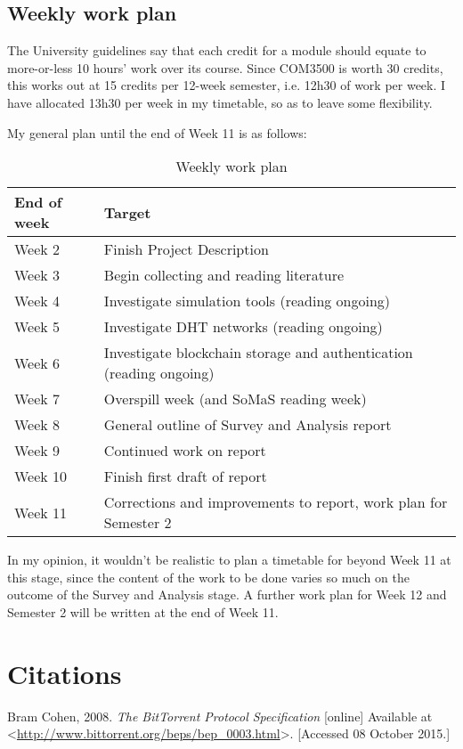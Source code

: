 \documentclass{article}
\begin{document}
\subsection{Weekly work plan}
The University guidelines say that each credit for a module should equate to more-or-less 10 hours' work over its course.  Since COM3500 is worth 30 credits, this works out at 15 credits per 12-week semester, i.e. 12h30 of work per week.  I have allocated 13h30 per week in my timetable, so as to leave some flexibility.

My general plan until the end of Week 11 is as follows:

\begin{table}[H]
  \centering
  \begin{tabular}{l l}
\textbf{End of week} & Target \\ \hline
Week 2               & Finish Project Description \\
Week 3               & Begin collecting and reading literature \\
Week 4               & Investigate simulation tools (reading ongoing) \\
Week 5               & Investigate DHT networks (reading ongoing) \\
Week 6               & Investigate blockchain storage and authentication (reading ongoing) \\
Week 7               & Overspill week (and SoMaS reading week) \\
Week 8               & General outline of Survey and Analysis report \\
Week 9               & Continued work on report \\
Week 10              & Finish first draft of report \\
Week 11              & Corrections and improvements to report, work plan for Semester 2 \\
  \end{tabular}
  \caption{Weekly work plan}
\end{table}

In my opinion, it wouldn't be realistic to plan a timetable for beyond Week 11 at this stage, since the content of the work to be done varies so much on the outcome of the Survey and Analysis stage.  A further work plan for Week 12 and Semester 2 will be written at the end of Week 11.

\section{Citations}
Bram Cohen, 2008.  \emph{The BitTorrent Protocol Specification} [online] Available at <\url{http://www.bittorrent.org/beps/bep_0003.html}>.  [Accessed 08 October 2015.]
\end{document}
